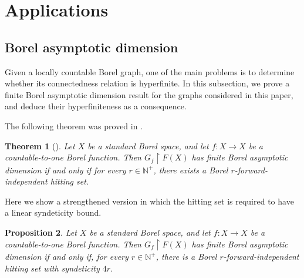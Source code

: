 \documentclass[11pt, reqno, a4paper]{amsart}
\newtheorem{theorem}{Theorem}[section]
\newtheorem{proposition}[theorem]{Proposition}
\theoremstyle{definition}
\theoremstyle{plain}
\begin{document}
\section{Applications}
\subsection{Borel asymptotic dimension}
Given a locally countable Borel graph, one of the main problems is to determine whether its 
connectedness relation is hyperfinite. In this subsection, we prove
a finite Borel asymptotic dimension result for the graphs considered in this
paper, and deduce their hyperfiniteness as a consequence.

The following theorem was proved in \cite{GrebikHiggins2026}.

\begin{theorem}[{\cite[Theorem 1.2]{GrebikHiggins2026}}]
\label{thm:singlefunction}
Let $X$ be a standard Borel space, and let $f:X\to X$ be a
countable-to-one Borel function. Then $G_f\upharpoonright F(X)$ has finite
Borel asymptotic dimension if and only if for every $r\in\mathbb N^+$, there
exists a Borel $r$-forward-independent hitting set.
\end{theorem}

Here we show a strengthened version in which the hitting set is required to have a linear syndeticity bound.

\begin{proposition} \label{prop:42}
     Let $X$ be a standard Borel space, and let $f:X\to X$ be a
countable-to-one Borel function. Then $G_f\upharpoonright F(X)$ has finite Borel asymptotic dimension if and only if, for every $r\in\mathbb N^+$, there is a Borel $r$-forward-independent hitting set with syndeticity $4r$.
\end{proposition}
\end{document}
